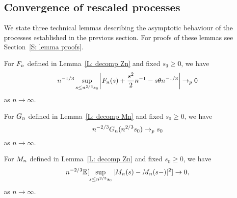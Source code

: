 \subsection{Convergence of rescaled processes}
We state three technical lemmas describing the asymptotic behaviour of the processes established in the previous section.
For proofs of these lemmas see Section~\ref{S: lemma proofs}.

\begin{lemma} \label{L: limit An}
	For $F_n$ defined in Lemma~\ref{L: decomp Zn} and fixed $s_0 \geq 0$, we have
	\begin{equation} \label{E: limit An}
	n^{-1 / 3} \sup_{s \leq n^{2 / 3} s_0 } \left| F_n(s) + \frac{s^2}{2}n^{-1} - s\theta n^{-1 / 3} \right| \rightarrow_p 0
	\end{equation}
	as $n \rightarrow \infty$.
\end{lemma}

\begin{lemma} \label{L: limit Bn}
	For $G_n$ defined in Lemma~\ref{L: decomp Mn} and fixed $s_0 \geq 0$, we have
	\begin{equation} \label{E: limit Bn}
	n^{-2 / 3} G_n(n^{2 / 3}s_0) \rightarrow_p s_0
	\end{equation}
	as $n \rightarrow \infty$.
\end{lemma}

\begin{lemma} \label{L: limit Mn}
	For $M_n$ defined in Lemma~\ref{L: decomp Zn} and fixed $s_0 \geq 0$, we have
	\begin{equation} \label{E: limit Mn}
	n^{-2 / 3} \mathbb{E}[\sup_{s \leq n^{2 / 3} s_0 } |M_n(s) - M_n(s-)|^2] \rightarrow 0,
	\end{equation}
	as $n\rightarrow \infty$.
\end{lemma}

